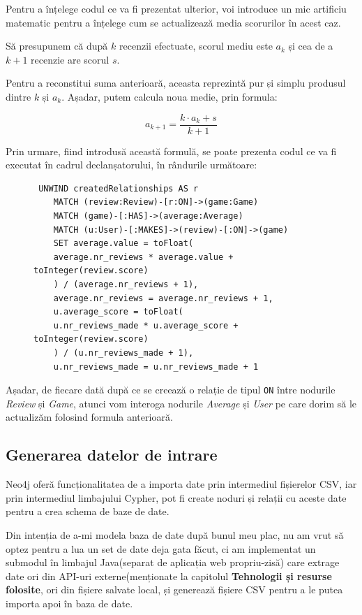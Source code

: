 \documentclass[12pt,a4paper]{report}
\begin{document}
Pentru a înțelege codul ce va fi prezentat ulterior, voi introduce un mic artificiu matematic pentru a înțelege cum se actualizează media scorurilor în acest caz.

\bigskip

Să presupunem că după \( k \) recenzii efectuate, scorul mediu este \( a_k \) și cea de a \( k+1 \) recenzie are scorul \( s \).

Pentru a reconstitui suma anterioară, aceasta reprezintă pur și simplu produsul dintre \( k \) și \( a_k \). Așadar, putem calcula noua medie, prin formula: 

\[ a_{k+1} = \frac{k \cdot a_k + s}{k+1} \]

Prin urmare, fiind introdusă această formulă, se poate prezenta codul ce va fi executat în cadrul declanșatorului, în rândurile următoare:

\begin{figure}[h]
\centering
\begin{BVerbatim}
 UNWIND createdRelationships AS r 
    MATCH (review:Review)-[r:ON]->(game:Game)
    MATCH (game)-[:HAS]->(average:Average)
    MATCH (u:User)-[:MAKES]->(review)-[:ON]->(game)
    SET average.value = toFloat(
    average.nr_reviews * average.value + toInteger(review.score)
    ) / (average.nr_reviews + 1),
	average.nr_reviews = average.nr_reviews + 1,
    u.average_score = toFloat(
    u.nr_reviews_made * u.average_score + toInteger(review.score)
    ) / (u.nr_reviews_made + 1),
    u.nr_reviews_made = u.nr_reviews_made + 1
\end{BVerbatim}
\caption*{}
\end{figure}

Așadar, de fiecare dată după ce se creează o relație de tipul \texttt{ON} între nodurile \emph{Review} și \emph{Game}, atunci vom interoga nodurile \emph{Average} și \emph{User} pe care dorim să le actualizăm folosind formula anterioară.

\subsection{Generarea datelor de intrare}

Neo4j oferă funcționalitatea de a importa date prin intermediul fișierelor CSV, iar prin intermediul limbajului Cypher, pot fi create noduri și relații cu aceste date pentru a crea schema de baze de date.

Din intenția de a-mi modela baza de date după bunul meu plac, nu am vrut să optez pentru a lua un set de date deja gata făcut, ci am implementat un submodul în limbajul Java(separat de aplicația web propriu-zisă) care extrage date ori din API-uri externe(menționate la capitolul \textbf{Tehnologii și resurse folosite}, ori din fișiere salvate local, și generează fișiere CSV pentru a le putea importa apoi în baza de date.
\end{document}
